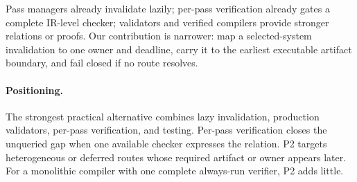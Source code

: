 Pass managers already invalidate lazily; per-pass verification already gates a complete IR-level checker; validators and verified compilers provide stronger relations or proofs. Our contribution is narrower: map a selected-system invalidation to one owner and deadline, carry it to the earliest executable artifact boundary, and fail closed if no route resolves.

\paragraph{Positioning.}
The strongest practical alternative combines lazy invalidation, production validators, per-pass verification, and testing. Per-pass verification closes the unqueried gap when one available checker expresses the relation. P2 targets heterogeneous or deferred routes whose required artifact or owner appears later. For a monolithic compiler with one complete always-run verifier, P2 adds little.
